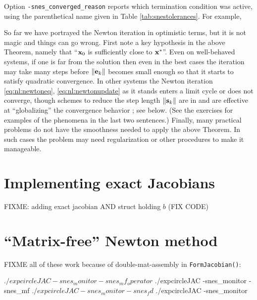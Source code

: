 \medskip
Option \texttt{-snes\_converged\_reason} reports which termination condition was active, using the parenthetical name given in Table \ref{tab:snestolerances}.  For example,

So far we have portrayed the Newton iteration in optimistic terms, but it is not magic and things can go wrong.  First note a key hypothesis in the above Theorem, namely that ``$\mathbf{x}_0$ is sufficiently close to $\mathbf{x}^*$''.  Even on well-behaved systems, if one is far from the solution then even in the best cases the iteration may take many steps before $\|\mathbf{e}_k\|$ becomes small enough so that it starts to satisfy quadratic convergence.  In other systems the Newton iteration \eqref{eq:nl:newtoneq}, \eqref{eq:nl:newtonupdate} as it stands enters a limit cycle or does not converge, though schemes to reduce the step length $\|\mathbf{s}_k\|$ are in \PETSc and are effective at ``globalizing'' the convergence behavior \citep{Kelley2003}; see below.  (See the exercises for examples of the phenomena in the last two sentences.)  Finally, many practical problems do not have the smoothness needed to apply the above Theorem.  In such cases the problem may need regularization or other procedures to make it manageable.


\section{Implementing exact Jacobians}

FIXME: adding exact jacobian AND struct holding $b$ (FIX CODE)




\section{``Matrix-free'' Newton method}

FIXME all of these work because of double-mat-assembly in \texttt{FormJacobian()}:

\begin{cline}
$ ./expcircleJAC -snes_monitor -snes_mf_operator
$ ./expcircleJAC -snes_monitor -snes_mf
$ ./expcircleJAC -snes_monitor -snes_fd
$ ./expcircleJAC -snes_monitor
\end{cline}

